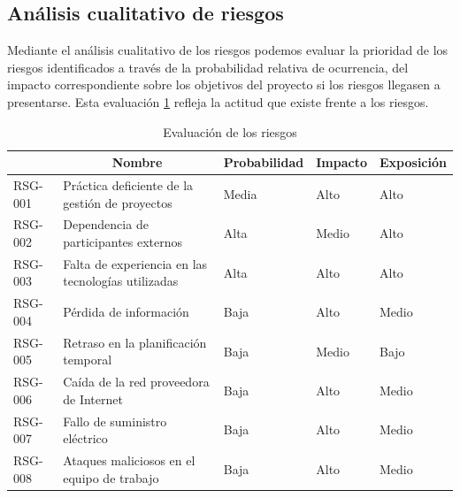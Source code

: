 \subsection{Análisis cualitativo de riesgos}
Mediante el análisis cualitativo de los riesgos podemos evaluar la prioridad de los riesgos identificados a través de la probabilidad relativa de ocurrencia, del impacto correspondiente sobre los objetivos del proyecto si los riesgos llegasen a presentarse. Esta evaluación \ref{tab_eval_riesgos} refleja la actitud que existe frente a los riesgos. 

\begin{table}[htpb]
\centering
\begin{tabularx}{\textwidth}{|l|X|l|l|l|}
\hline
\rowcolor[gray]{0.9}\multicolumn{1}{|c|}{\textbf{Identificador}} & \multicolumn{1}{c|}{\textbf{Nombre}}                        & \multicolumn{1}{c|}{\textbf{Probabilidad}} & \multicolumn{1}{c|}{\textbf{Impacto}} & \multicolumn{1}{c|}{\textbf{Exposición}} \\ \hline
RSG-001                             & Práctica deficiente de la gestión de proyectos     & Media                             & Alto                         & Alto                            \\ \hline
RSG-002                             & Dependencia de participantes externos              & Alta                              & Medio                        & Alto                            \\ \hline
RSG-003                             & Falta de experiencia en las tecnologías utilizadas & Alta                              & Alto                         & Alto                            \\ \hline
RSG-004                             & Pérdida de información                             & Baja                              & Alto                         & Medio                           \\ \hline
RSG-005                             & Retraso en la planificación temporal               & Baja                              & Medio                        & Bajo                            \\ \hline
RSG-006                             & Caída de la red proveedora de Internet             & Baja                              & Alto                         & Medio                           \\ \hline
RSG-007                             & Fallo de suministro eléctrico                      & Baja                              & Alto                         & Medio                           \\ \hline
RSG-008                             & Ataques maliciosos en el equipo de trabajo         & Baja                              & Alto                         & Medio                           \\ \hline
\end{tabularx}
\caption{Evaluación de los riesgos}
\label{tab_eval_riesgos}
\end{table}

